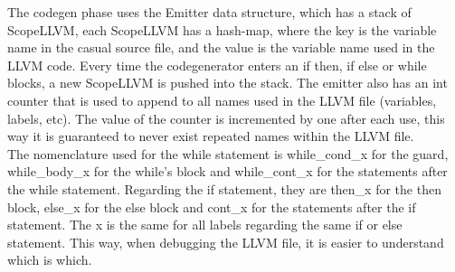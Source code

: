 \documentclass[12pt]{article}
\begin{document}
The codegen phase uses the Emitter data structure, which has a stack of ScopeLLVM, each ScopeLLVM has a hash-map, where the key is the variable name in the casual source file, and the value is the variable name used in the LLVM code. Every time the codegenerator enters an if then, if else or while blocks, a new ScopeLLVM is pushed into the stack.
The emitter also has an int counter that is used to append to all names used in the LLVM file (variables, labels, etc). The value of the counter is incremented by one after each use, this way it is guaranteed to never exist repeated names within the LLVM file.\\

The nomenclature used for the while statement is while\_cond\_x for the guard, while\_body\_x for the while's block and while\_cont\_x for the statements after the while statement.
Regarding the if statement, they are then\_x for the then block, else\_x for the else block and cont\_x for the statements after the if statement. The x is the same for all labels regarding the same if or else statement. This way, when debugging the LLVM file, it is easier to understand which is which.


\end{document}
